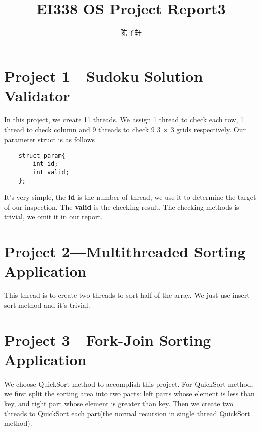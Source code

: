 \documentclass[UTF8]{ctexart}
\title{EI338 OS Project Report3}
\author{陈子轩}
\begin{document}
\maketitle
\section{Project 1—Sudoku Solution Validator}
In this project, we create 11 threads. We assign 1 thread to check each row, 1 thread to check column and 9 threads to check 9 3 $\times$ 3 grids respectively. Our parameter struct is as follows
\begin{verbatim}
    struct param{
        int id;
        int valid;
    };
\end{verbatim}
It's very simple, the \textbf{id} is the number of thread, we use it to determine the target of our inspection. The \textbf{valid} is the checking result. The checking methods is trivial, we omit it in our report.
\section{Project 2—Multithreaded Sorting Application}
This thread is to create two threads to sort half of the array. We just use insert sort method and it's trivial.
\section{Project 3—Fork-Join Sorting Application}
We choose QuickSort method to accomplish this project. For QuickSort method, we first split the sorting area into two parts: left parts whose element is less than key, and right part whose element is greater than key. Then we create two threads to QuickSort each part(the normal recursion in single thread QuickSort method).
\end{document}

